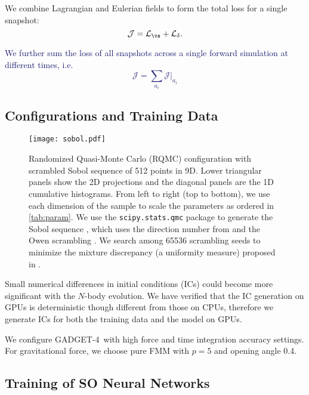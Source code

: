 \documentclass[modern, trackchanges, dvipsnames]{aastex631}
\newcommand{\GADGET}{{{\fontsize{10pt}{12pt}\selectfont GADGET}-4}}
\newcommand{\cJ}{\mathcal{J}}
\newcommand{\cL}{\mathcal{L}}
\newcommand{\YZ}[1]{\textcolor{MidnightBlue}{#1}}
\begin{document}
We combine Lagrangian and Eulerian fields to form the total loss for a single
snapshot:
%
\begin{equation}
\cJ = \cL_\vs + \cL_\delta.
\end{equation}
%

\YZ{We further sum the loss of all snapshots across a single forward simulation
at different times, i.e.
\begin{equation}
\cJ = \sum_{a_i} \cJ |_{a_i}
\end{equation}
}


\vspace{1em}
\subsection{Configurations and Training Data}

\begin{figure*}
  \centering
  \texttt{[image: sobol.pdf]}
  \caption{Randomized Quasi-Monte Carlo (RQMC) configuration with
    scrambled Sobol sequence of 512 points in 9D.
    Lower triangular panels show the 2D projections and the diagonal
    panels are the 1D cumulative histograms.
    From left to right (top to bottom), we use each dimension of the
    sample to scale the parameters as ordered in \autoref{tab:param}.
    We use the \texttt{scipy.stats.qmc} package \citep{SciPy} to
    generate the Sobol sequence \citep{Sobol1967}, which uses the
    direction number from \citet{JoeKuo2008} and the Owen scrambling
    \citep{Owen1998}.
    We search among 65536 scrambling seeds to minimize the mixture
    discrepancy (a uniformity measure) proposed in \citet{Zhou2013MD}.
  }
  \label{fig:sobol}
\end{figure*}

Small numerical differences in initial conditions (ICs) could become more
significant with the $N$-body evolution.
We have verified that the IC generation on GPUs is deterministic though
different from those on CPUs, therefore we generate ICs for both the training
data and the model on GPUs.

We configure \GADGET\ with high force and time integration accuracy
settings.
For gravitational force, we choose pure FMM with $p=5$ and opening angle
0.4.


\vspace{1em}
\subsection{Training of SO Neural Networks}
\end{document}

